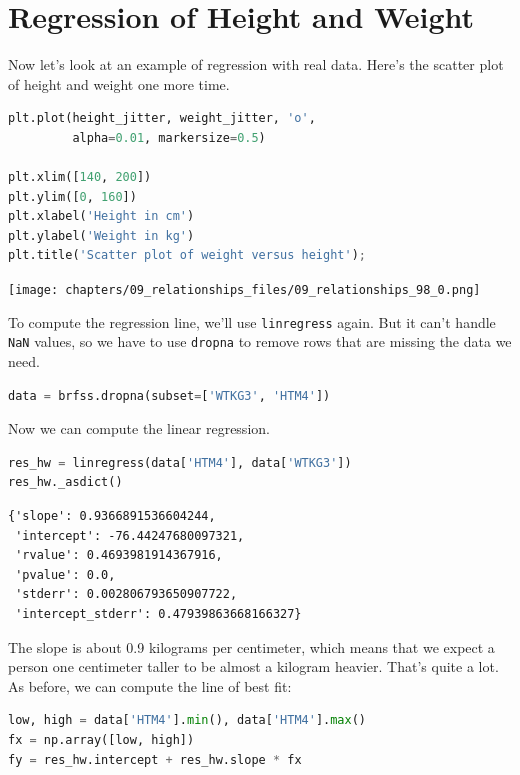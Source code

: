 \section{Regression of Height and
Weight}\label{regression-of-height-and-weight}

Now let's look at an example of regression with real data. Here's the
scatter plot of height and weight one more time.

\begin{lstlisting}[language=Python,style=source]
plt.plot(height_jitter, weight_jitter, 'o', 
         alpha=0.01, markersize=0.5)

plt.xlim([140, 200])
plt.ylim([0, 160])
plt.xlabel('Height in cm')
plt.ylabel('Weight in kg')
plt.title('Scatter plot of weight versus height');
\end{lstlisting}

\begin{center}
\texttt{[image: chapters/09\_relationships\_files/09\_relationships\_98\_0.png]}
\end{center}

To compute the regression line, we'll use
\passthrough{\lstinline!linregress!} again. But it can't handle
\passthrough{\lstinline!NaN!} values, so we have to use
\passthrough{\lstinline!dropna!} to remove rows that are missing the
data we need.

\begin{lstlisting}[language=Python,style=source]
data = brfss.dropna(subset=['WTKG3', 'HTM4'])
\end{lstlisting}

Now we can compute the linear regression.

\begin{lstlisting}[language=Python,style=source]
res_hw = linregress(data['HTM4'], data['WTKG3'])
res_hw._asdict()
\end{lstlisting}

\begin{lstlisting}[style=output]
{'slope': 0.9366891536604244,
 'intercept': -76.44247680097321,
 'rvalue': 0.4693981914367916,
 'pvalue': 0.0,
 'stderr': 0.002806793650907722,
 'intercept_stderr': 0.47939863668166327}
\end{lstlisting}

The slope is about 0.9 kilograms per centimeter, which means that we
expect a person one centimeter taller to be almost a kilogram heavier.
That's quite a lot. As before, we can compute the line of best fit:

\begin{lstlisting}[language=Python,style=source]
low, high = data['HTM4'].min(), data['HTM4'].max()
fx = np.array([low, high])
fy = res_hw.intercept + res_hw.slope * fx
\end{lstlisting}

